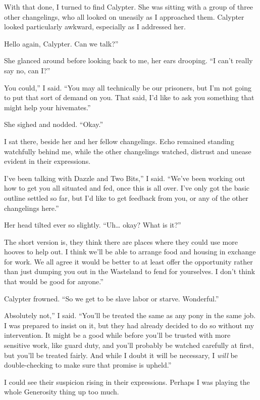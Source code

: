 With that done, I turned to find Calypter. She was sitting with a group of three other changelings, who all looked on uneasily as I approached them. Calypter looked particularly awkward, especially as I addressed her.

\leavevmode{}Hello again, Calypter. Can we talk?”

She glanced around before looking back to me, her ears drooping. “I can’t really say no, can I?”

\leavevmode{}You could,” I said. “You may all technically be our prisoners, but I’m not going to put that sort of demand on you. That said, I’d like to ask you something that might help your hivemates.”

She sighed and nodded. “Okay.”

I sat there, beside her and her fellow changelings. Echo remained standing watchfully behind me, while the other changelings watched, distrust and unease evident in their expressions.

\leavevmode{}I’ve been talking with Dazzle and Two Bits,” I said. “We’ve been working out how to get you all situated and fed, once this is all over. I’ve only got the basic outline settled so far, but I’d like to get feedback from you, or any of the other changelings here.”

Her head tilted ever so slightly. “Uh… okay? What is it?”

\leavevmode{}The short version is, they think there are places where they could use more hooves to help out. I think we’ll be able to arrange food and housing in exchange for work. We all agree it would be better to at least offer the opportunity rather than just dumping you out in the Wasteland to fend for yourselves. I don’t think that would be good for anyone.”

Calypter frowned. “So we get to be slave labor or starve. Wonderful.”

\leavevmode{}Absolutely not,” I said. “You’ll be treated the same as any pony in the same job. I was prepared to insist on it, but they had already decided to do so without my intervention. It might be a good while before you’ll be trusted with more sensitive work, like guard duty, and you’ll probably be watched carefully at first, but you’ll be treated fairly. And while I doubt it will be necessary, I \textit{will} be double-checking to make sure that promise is upheld.”

I could see their suspicion rising in their expressions. Perhaps I was playing the whole Generosity thing up too much.

